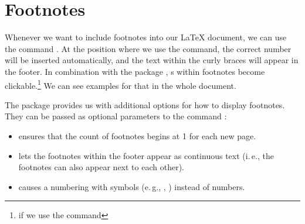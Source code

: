 \chapter{Footnotes}
\label{sec:footnotes}

Whenever we want to include footnotes into our \LaTeX{} document, we can use 
the command . At the position where we use 
the command, the correct number will be inserted automatically, and the text 
within the curly braces will appear in the footer. In combination with the 
package , s within footnotes become 
clickable.\footnote{if we use the command }
We can see examples for that in the whole document.

The package  provides us with additional options for how to display footnotes. They can be passed as optional parameters to the command :
\begin{itemize}
  \item {} ensures that the count of footnotes begins at 1 for each new page.
  \item {} lets the footnotes within the footer appear as continuous text (i.\,e., the footnotes can also appear next to each other).
  \item {} causes a numbering with symbols (e.\,g.,  \textdagger, \textdaggerdbl) instead of numbers.
\end{itemize}

